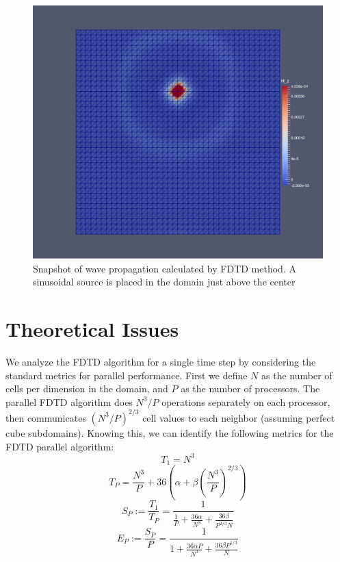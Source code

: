 \documentclass{article}
\begin{document}
\begin{figure}[h]
\centering
\includegraphics[scale=0.2]{figs/wave_propagation.eps}
\caption{Snapshot of wave propagation calculated by FDTD method. A sinusoidal source is placed in the domain just above the center}
\end{figure}


% 

\section{Theoretical Issues}

We analyze the FDTD algorithm for a single time step by considering the standard metrics for parallel performance. First we define $N$ as the number of cells per dimension in the domain, and $P$ as the number of processors. The parallel FDTD algorithm does $N^3/P$ operations separately on each processor, then communicates $(N^3/P)^{2/3}$ cell values to each neighbor (assuming perfect cube subdomains). Knowing this, we can identify the following metrics for the FDTD parallel algorithm: \\
$$T_1 = N^3$$
$$T_P = \frac{N^3}{P} + 36(\alpha + \beta(\frac{N^3}{P})^{2/3})$$
$$S_P := \frac{T_1}{T_P} = \frac{1}{\frac{1}{P} + \frac{36\alpha}{N^3} + \frac{36\beta}{P^{2/3}N}}$$
$$E_P := \frac{S_P}{P} = \frac{1}{1 + \frac{36\alpha P}{N^3} + \frac{36\beta P^{1/3}}{N}}$$
\end{document}
